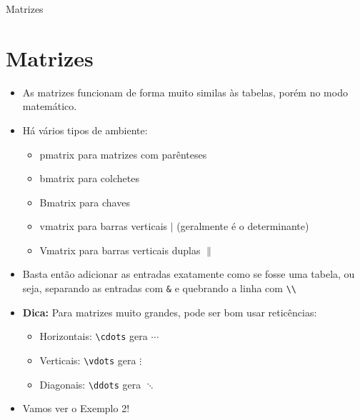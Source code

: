 \documentclass[12pt]{beamer}
\begin{document}
\begin{frame}{Matrizes}
  \section{Matrizes}
  \begin{itemize}
    \item As matrizes funcionam de forma muito similas às tabelas, porém no modo matemático.
    \item Há vários tipos de ambiente:
    \begin{itemize}
      \item pmatrix para matrizes com parênteses
      \item bmatrix para colchetes
      \item Bmatrix para chaves
      \item vmatrix para barras verticais $|$ (geralmente é o determinante)
      \item Vmatrix para barras verticais duplas $\|$
    \end{itemize}
  \end{itemize}
\end{frame}

\begin{frame}[fragile]
  \begin{itemize}
    \item Basta então adicionar as entradas exatamente como se fosse uma tabela, ou seja, separando as entradas com \verb+&+ e quebrando a linha com \verb+\\+
    \item \textbf{Dica:} Para matrizes muito grandes, pode ser bom usar reticências:
    \begin{itemize}
      \item Horizontais: \verb+\cdots+ gera $\cdots$
      \item Verticais: \verb+\vdots+ gera $\vdots$
      \item Diagonais: \verb+\ddots+ gera $\ddots$
    \end{itemize}
    \item Vamos ver o Exemplo 2!
  \end{itemize}

\end{frame}
\end{document}
